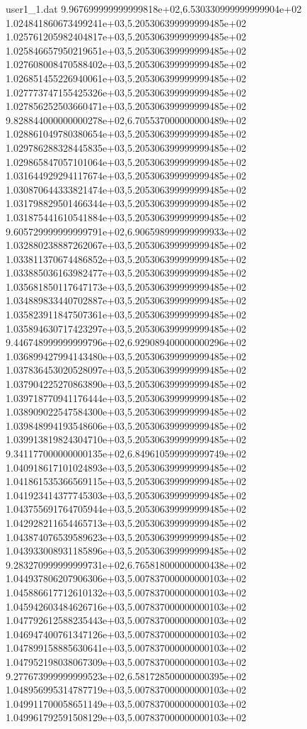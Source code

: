 \begin{filecontents}{user1_1.dat}
9.967699999999999818e+02,6.530330999999999904e+02
1.024841860673499241e+03,5.205306399999999485e+02
1.025761205982404817e+03,5.205306399999999485e+02
1.025846657950219651e+03,5.205306399999999485e+02
1.027608008470588402e+03,5.205306399999999485e+02
1.026851455226940061e+03,5.205306399999999485e+02
1.027773747155425326e+03,5.205306399999999485e+02
1.027856252503660471e+03,5.205306399999999485e+02
9.828844000000000278e+02,6.705537000000000489e+02
1.028861049780380654e+03,5.205306399999999485e+02
1.029786288328445835e+03,5.205306399999999485e+02
1.029865847057101064e+03,5.205306399999999485e+02
1.031644929294117674e+03,5.205306399999999485e+02
1.030870644333821474e+03,5.205306399999999485e+02
1.031798829501466344e+03,5.205306399999999485e+02
1.031875441610541884e+03,5.205306399999999485e+02
9.605729999999999791e+02,6.906598999999999933e+02
1.032880238887262067e+03,5.205306399999999485e+02
1.033811370674486852e+03,5.205306399999999485e+02
1.033885036163982477e+03,5.205306399999999485e+02
1.035681850117647173e+03,5.205306399999999485e+02
1.034889833440702887e+03,5.205306399999999485e+02
1.035823911847507361e+03,5.205306399999999485e+02
1.035894630717423297e+03,5.205306399999999485e+02
9.446748999999999796e+02,6.929089400000000296e+02
1.036899427994143480e+03,5.205306399999999485e+02
1.037836453020528097e+03,5.205306399999999485e+02
1.037904225270863890e+03,5.205306399999999485e+02
1.039718770941176444e+03,5.205306399999999485e+02
1.038909022547584300e+03,5.205306399999999485e+02
1.039848994193548606e+03,5.205306399999999485e+02
1.039913819824304710e+03,5.205306399999999485e+02
9.341177000000000135e+02,6.849610599999999749e+02
1.040918617101024893e+03,5.205306399999999485e+02
1.041861535366569115e+03,5.205306399999999485e+02
1.041923414377745303e+03,5.205306399999999485e+02
1.043755691764705944e+03,5.205306399999999485e+02
1.042928211654465713e+03,5.205306399999999485e+02
1.043874076539589623e+03,5.205306399999999485e+02
1.043933008931185896e+03,5.205306399999999485e+02
9.283270999999999731e+02,6.765818000000000438e+02
1.044937806207906306e+03,5.007837000000000103e+02
1.045886617712610132e+03,5.007837000000000103e+02
1.045942603484626716e+03,5.007837000000000103e+02
1.047792612588235443e+03,5.007837000000000103e+02
1.046947400761347126e+03,5.007837000000000103e+02
1.047899158885630641e+03,5.007837000000000103e+02
1.047952198038067309e+03,5.007837000000000103e+02
9.277673999999999523e+02,6.581728500000000395e+02
1.048956995314787719e+03,5.007837000000000103e+02
1.049911700058651149e+03,5.007837000000000103e+02
1.049961792591508129e+03,5.007837000000000103e+02

\end{filecontents}
